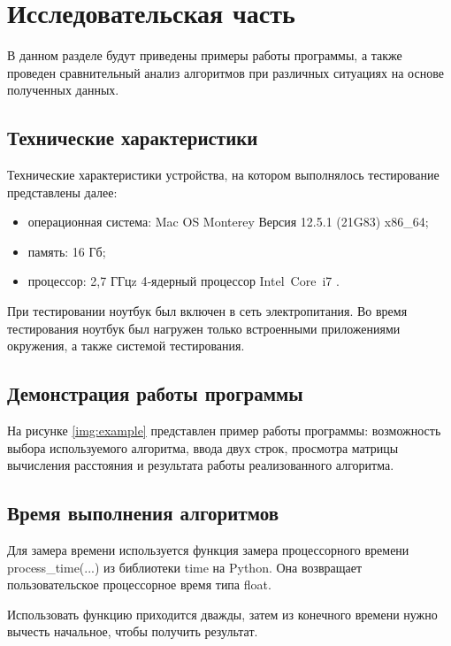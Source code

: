 \chapter{Исследовательская часть}

В данном разделе будут приведены примеры работы программы, а также проведен сравнительный анализ алгоритмов при различных ситуациях на основе полученных данных.

\section{Технические характеристики}

Технические характеристики устройства, на котором выполнялось тестирование представлены далее:

\begin{itemize}[label=---]
    \item операционная система: Mac OS Monterey Версия 12.5.1 (21G83) \cite{macos} x86\_64;
    \item память: 16 Гб;
    \item процессор: 2,7 ГГцz 4‑ядерный процессор Intel Core i7 \cite{intel}.
\end{itemize}

При тестировании ноутбук был включен в сеть электропитания. Во время тестирования ноутбук был нагружен только встроенными приложениями окружения, а также системой тестирования.

\section{Демонстрация работы программы}

На рисунке \ref{img:example} представлен пример работы программы: возможность выбора используемого алгоритма, ввода двух строк, просмотра матрицы вычисления расстояния и результата работы реализованного алгоритма.

\clearpage

\section{Время выполнения алгоритмов}

Для замера времени используется функция замера процессорного времени process\_time(...) из библиотеки time на Python. Она возвращает пользовательское процессорное время типа float.

Использовать функцию приходится дважды, затем из конечного времени нужно вычесть начальное, чтобы получить результат.

